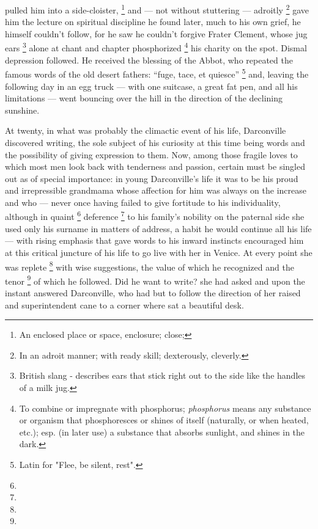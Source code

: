 pulled him into a side-cloister, 
\footnote{An enclosed place or space, enclosure; close;}
and --- not without stuttering --- adroitly 
\footnote{In an adroit manner; with ready skill; dexterously, cleverly.}
gave him
the lecture on spiritual discipline he found later, much to his own grief, he
himself couldn’t follow, for he saw he couldn’t forgive Frater Clement, whose
jug ears
\footnote{British slang - describes ears that stick right out to the side like the 
handles of a milk jug.}
alone at chant and chapter phosphorized 
\footnote{To combine or impregnate with phosphorus; \textit{phosphorus} means
any substance or organism that phosphoresces or shines of itself (naturally, or 
when heated, etc.); esp. (in later use) a substance that absorbs sunlight, and 
shines in the dark. 
}
his charity on the spot. Dismal
depression followed. He received the blessing of the Abbot, who repeated the
famous words of the old desert fathers: “fuge, tace, et quiesce” 
\footnote{Latin for "Flee, be silent, rest".}
and, leaving
the following day in an egg truck --- with one suitcase, a great fat pen, and all
his limitations --- went bouncing over the hill in the direction of the declining
sunshine.

  At twenty, in what was probably the climactic event of his life, Darconville
discovered writing, the sole subject of his curiosity at this time being words
and the possibility of giving expression to them. Now, among those fragile loves
to which most men look back with tenderness and passion, certain must be singled
out as of special importance: in young Darconville’s life it was to be his proud
and irrepressible grandmama whose affection for him was always on the increase
and who --- never once having failed to give fortitude to his individuality,
although in quaint 
\footnote{}
deference 
\footnote{}
to his family’s nobility on the paternal side she
used only his surname in matters of address, a habit he would continue all his
life --- with rising emphasis that gave words to his inward instincts encouraged him
at this critical juncture of his life to go live with her in Venice. At every
point she was replete 
\footnote{}
with wise suggestions, the value of which he recognized
and the tenor 
\footnote{}
of which he followed. Did he want to write? she had asked and upon
the instant answered Darconville, who had but to follow the direction of her
raised and superintendent cane to a corner where sat a beautiful desk.

